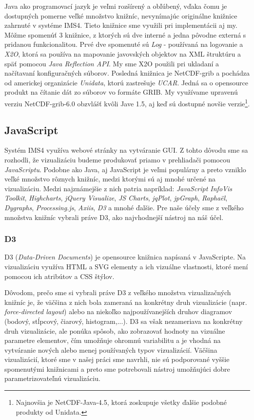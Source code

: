 Java ako programovací jazyk je veľmi rozšírený a obľúbený, vďaka čomu je dostupných pomerne veľké množstvo knižníc, nevynímajúc originálne knižnice zahrnuté v systéme IMS4. Tieto knižnice sme využili pri implementácii aj my. Môžme spomenúť 3 knižnice, z ktorých sú dve interné a jedna pôvodne externá s pridanou funkcionalitou. Prvé dve spomenuté sú \textit{Log} - používaná na logovanie a \textit{X2O}, ktorá sa používa na mapovanie javovských objektov na XML štruktúru a späť pomocou \textit{Java Reflection API}. My sme X2O použili pri ukladaní a načítavaní konfiguračných súborov. Posledná knižnica je NetCDF-grib \cite{Unidata} a pochádza od americkej organizácie \textit{Unidata}, ktorú zastrešuje \textit{UCAR}. Jedná sa o opensource produkt na čítanie dát zo súborov vo formáte GRIB. My využívame upravenú verziu NetCDF-grib-6.0 obzvlášť kvôli Jave 1.5, aj keď sú dostupné novšie verzie\footnote{Najnovšia je NetCDF-Java-4.5, ktorá zoskupuje všetky ďalšie podobné produkty od Unidata.}.

\subsection{JavaScript}
Systém IMS4 využíva webové stránky na vytváranie GUI. Z tohto dôvodu sme sa rozhodli, že vizualizáciu budeme produkovať priamo v prehliadači pomocou \textit{JavaScriptu}. Podobne ako Java, aj JavaScript je veľmi populárny a preto vzniklo veľké množstvo rôznych knižníc, medzi ktorými sú aj mnohé určené na vizualizáciu. Medzi najznámejšie z nich patria napríklad: \textit{JavaScript InfoVis Toolkit}, \textit{Highcharts}, \textit{jQuery Visualize}, \textit{JS Charts}, \textit{jqPlot}, \textit{jpGraph}, \textit{Raphaël}, \textit{Dygraphs},\textit{ Processing.js}, \textit{Axiis}, \textit{D3} a mnohé ďalšie. Pre naše účely sme z veľkého množstva knižníc vybrali práve D3, ako najvhodnejší nástroj na náš účel.

\subsubsection{D3}
D3 (\textit{Data-Driven Documents}) \cite{D3} je opensource knižnica napísaná v JavaScripte. Na vizualizáciu využíva HTML a SVG elementy a ich vizuálne vlastnosti, ktoré mení pomocou ich atribútov a CSS štýlov. 

Dôvodom, prečo sme si vybrali práve D3 z veľkého množstva vizualizačných knižníc je, že väčšina z nich bola zameraná na konkrétny druh vizualizácie (napr. \textit{force-directed layout}) alebo na niekoľko najpoužívanejších druhov diagramov (bodový, stĺpcový, čiarový, histogram,...). D3 sa však nezameriava na konkrétny druh vizualizácie, ale ponúka spôsob, ako zobrazovať hodnoty na vizuálne parametre elementov, čím umožňuje ohromnú variabilitu a je vhodná na vytváranie nových alebo menej používaných typov vizualizácií. Väčšina vizualizácií, ktoré sme v našej práci sme navrhli, nie sú podporované vyššie spomenutými knižnicami a preto sme potrebovali nástroj umožňujúci dobre parametrizovateľnú vizualizáciu.

